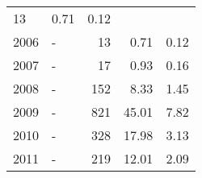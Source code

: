 \begin{longtable}{lXrrr}
       \num{13} &
       \num[round-mode=places,round-precision=2]{0,71} &
         \num[round-mode=places,round-precision=2]{0,12} \\

     2006 &
     \multicolumn{1}{X}{ -  } &


       \num{13} &
       \num[round-mode=places,round-precision=2]{0,71} &
         \num[round-mode=places,round-precision=2]{0,12} \\

     2007 &
     \multicolumn{1}{X}{ -  } &


       \num{17} &
       \num[round-mode=places,round-precision=2]{0,93} &
         \num[round-mode=places,round-precision=2]{0,16} \\

     2008 &
     \multicolumn{1}{X}{ -  } &


       \num{152} &
       \num[round-mode=places,round-precision=2]{8,33} &
         \num[round-mode=places,round-precision=2]{1,45} \\

     2009 &
     \multicolumn{1}{X}{ -  } &


       \num{821} &
       \num[round-mode=places,round-precision=2]{45,01} &
         \num[round-mode=places,round-precision=2]{7,82} \\

     2010 &
     \multicolumn{1}{X}{ -  } &


       \num{328} &
       \num[round-mode=places,round-precision=2]{17,98} &
         \num[round-mode=places,round-precision=2]{3,13} \\

     2011 &
     \multicolumn{1}{X}{ -  } &


       \num{219} &
       \num[round-mode=places,round-precision=2]{12,01} &
         \num[round-mode=places,round-precision=2]{2,09} \\


\end{longtable}

